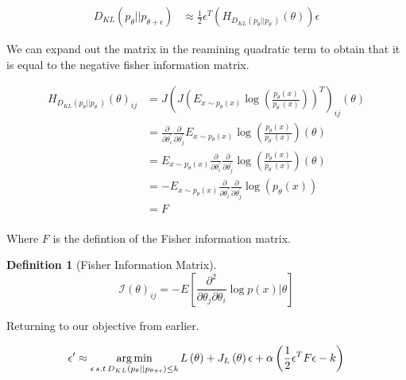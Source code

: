 \documentclass[12pt, a4paper]{report}
\theoremstyle{definition}
\newtheorem{definition}{Definition}[section]
\begin{document}
\begin{align}
    D_{KL} \left(p_\theta || p_{\theta + \epsilon} \right) &\approx  \frac{1}{2} \epsilon^T \left( H_{D_{KL} \left(p_\theta || p_{\theta^\prime} \right)}\left( \theta \right) \right) \epsilon
\end{align}


We can expand out the matrix in the reamining quadratic term to obtain that it is equal to the negative fisher information matrix.

\begin{align}
    H_{D_{KL} \left(p_\theta || p_{\theta^\prime} \right)}\left( \theta \right)_{ij} &= J \left( J \left( E_{x \sim p_\theta(x)}  \log \left( \frac{p_\theta(x)}{p_{\theta^\prime}(x)}\right)\right)^T \right)_{ij} \left( \theta \right) \\
    &= \frac{\partial}{\partial \theta^\prime_i} \frac{\partial}{\partial \theta^\prime_j} E_{x \sim p_\theta(x)}  \log \left( \frac{p_\theta(x)}{p_{\theta^\prime}(x)}\right) \left( \theta \right) \\
    &= E_{x \sim p_\theta(x)} \frac{\partial}{\partial \theta^\prime_i} \frac{\partial}{\partial \theta^\prime_j}  \log \left( \frac{p_\theta(x)}{p_{\theta^\prime}(x)}\right) \left( \theta \right) \\
    &= - E_{x \sim p_\theta(x)} \frac{\partial}{\partial \theta^\prime_i} \frac{\partial}{\partial \theta^\prime_j}  \log \left( p_{\theta}(x) \right)  \\
    &= F \\
\end{align}

Where $F$ is the defintion of the Fisher information matrix.


\begin{definition}[Fisher Information Matrix]
    $$\mathcal{I} \left( \theta\right)_{ij} = - E \left[ \frac{\partial^2}{\partial \theta_j  \partial \theta_i }  \log p \left(x  \right)\big| \theta \right]$$
\end{definition}

Returning to our objective from earlier.

\begin{align}
    \epsilon^\prime &\approx \operatorname*{arg\,min}_{\epsilon \, s.t \, D_{KL} \left(p_\theta || p_{\theta + \epsilon} \right) \leq k}  L\left( \theta \right) +  J_L \left( \theta\right) \epsilon  + \alpha \left( \frac{1}{2} \epsilon^T F \epsilon - k\right) \\
\end{align}
\end{document}
